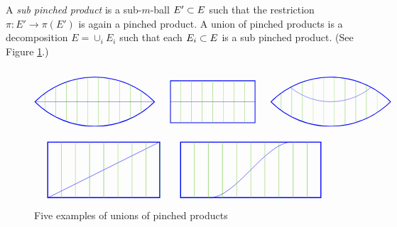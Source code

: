 A {\it sub pinched product} is a sub-$m$-ball $E'\subset E$ such that the restriction
$\pi:E'\to \pi(E')$ is again a pinched product.
A {union} of pinched products is a decomposition $E = \cup_i E_i$
such that each $E_i\subset E$ is a sub pinched product.
(See Figure \ref{pinched_prod_unions}.)
\begin{figure}[t]
$$
\begin{tikzpicture}[baseline=0]
\begin{scope}
\path[clip] (0,0) arc (135:45:4) arc (-45:-135:4);
\draw[blue,line width=2pt] (0,0) arc (135:45:4) arc (-45:-135:4);
\draw[blue] (0,0) -- (5.66,0);
\foreach \x in {0, 0.5, ..., 6} {
	\draw[green!50!brown] (\x,-2) -- (\x,2);
}
\end{scope}
\end{tikzpicture}
\qquad
\begin{tikzpicture}[baseline=0]
\begin{scope}
\path[clip] (0,-1) rectangle (4,1);
\draw[blue,line width=2pt] (0,-1) rectangle (4,1);
\draw[blue] (0,0) -- (5,0);
\foreach \x in {0, 0.5, ..., 6} {
	\draw[green!50!brown] (\x,-2) -- (\x,2);
}
\end{scope}
\end{tikzpicture}
\qquad
\begin{tikzpicture}[baseline=0]
\begin{scope}
\path[clip] (0,0) arc (135:45:4) arc (-45:-135:4);
\draw[blue,line width=2pt] (0,0) arc (135:45:4) arc (-45:-135:4);
\draw[blue] (2.83,3) circle (3);
\foreach \x in {0, 0.5, ..., 6} {
	\draw[green!50!brown] (\x,-2) -- (\x,2);
}
\end{scope}
\end{tikzpicture}
$$
$$
\begin{tikzpicture}[baseline=0]
\begin{scope}
\path[clip] (0,-1) rectangle (4,1);
\draw[blue,line width=2pt] (0,-1) rectangle (4,1);
\draw[blue] (0,-1) -- (4,1);
\foreach \x in {0, 0.5, ..., 6} {
	\draw[green!50!brown] (\x,-2) -- (\x,2);
}
\end{scope}
\end{tikzpicture}
\qquad
\begin{tikzpicture}[baseline=0]
\begin{scope}
\path[clip] (0,-1) rectangle (5,1);
\draw[blue,line width=2pt] (0,-1) rectangle (5,1);
\draw[blue] (1,-1) .. controls  (2,-1) and (3,1) .. (4,1);
\foreach \x in {0, 0.5, ..., 6} {
	\draw[green!50!brown] (\x,-2) -- (\x,2);
}
\end{scope}
\end{tikzpicture}
$$
\caption{Five examples of unions of pinched products}\label{pinched_prod_unions}
\end{figure}

